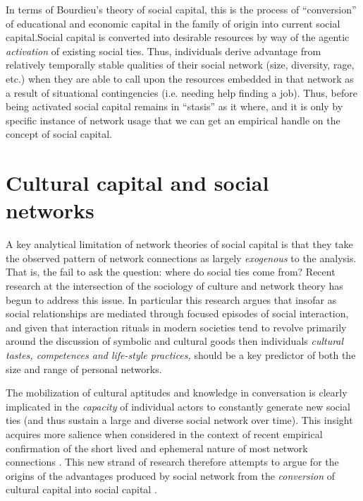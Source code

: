 \documentclass[12pt]{article}
\begin{document}
In terms of Bourdieu's \citeyearpar{bourdieu86} theory of social capital, this is the process of ``conversion'' of educational and economic capital in the family of origin into current social capital.Social capital is converted into desirable resources by way of the agentic \emph{activation} of existing social ties. Thus, individuals derive advantage from relatively temporally stable qualities of their social network (size, diversity, rage, etc.) when they are able to call upon the resources embedded in that network as a result of situational contingencies (i.e. needing help finding a job). Thus, before being activated social capital remains in ``stasis'' as it where, and it is only by specific instance of network usage that we can get an empirical handle on the concept of social capital.

\section{Cultural capital and social networks}
A key analytical limitation of network theories of social capital is that they take the observed pattern of network connections as largely \emph{exogenous} to the analysis. That is, the fail to ask the question: where do social ties come from? Recent research at the intersection of the sociology of culture and network theory has begun to address this issue. In particular this research argues that insofar as social relationships are mediated through focused episodes of social interaction, and given that interaction rituals in modern societies tend to revolve primarily around the discussion of symbolic and cultural goods \citep{dimaggio87, dimaggio00} then individuals \emph{cultural tastes, competences and life-style practices,} should be a key predictor of both the size and range of personal networks.

The mobilization of cultural aptitudes and knowledge in conversation is clearly implicated in the \emph{capacity }of individual actors to constantly generate new social ties (and thus sustain a large and diverse social network over time). This insight acquires more salience when considered in the context of recent empirical confirmation of the short lived and ephemeral nature of most network connections \citep{bidart_degenne05, bidart_lavenu05, burt00, burt02, suitor_etal97, suitor_keeton97, feld_etal07}. This new strand of research therefore attempts to argue for the origins of the advantages produced by social network from the \emph{conversion} of cultural capital into social capital \citep{bourdieu86}. 
\end{document}
